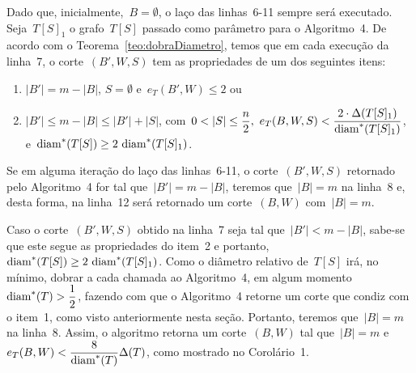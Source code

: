 		



		\bigskip

		Dado que, inicialmente,~$B=\emptyset$, o laço das
		linhas~6-11 sempre será executado.
		Seja~$T[S]_1$ o grafo~$T[S]$ passado como parâmetro para o Algoritmo~4.
		De acordo com o Teorema~\ref{teo:dobraDiametro},
		temos que em cada execução da linha~7, o corte~$(B',W,S)$
		tem as propriedades de um dos seguintes itens:
		\begin{enumerate}
			\item $|B'|=m-|B|$, $S=\emptyset$ e~$e_T(B',W)\le 2$ ou
			\item ${|B'|\le m-|B|\le |B'|+|S|}$, 
				com~${0<|S|\le\dfrac{n}{2},\
				e_T(B,W,S)< \dfrac{2\cdot 
				\Delta(T[S]_1)}{\diam^*(T[S]_1)}}$, 
				e~${\diam^*(T[S])\ge 2\ \diam^*(T[S]_1)}$.
		\end{enumerate} 
		Se em alguma iteração do laço das linhas~6-11, o corte~$(B',W,S)$ 
		retornado pelo Algoritmo~4 for tal que~${|B'| = m-|B|}$, 
		teremos que~${|B|=m}$ na linha~8 e,
		desta forma, na linha~12 será retornado um corte~$(B,W)$
		com~${|B| = m}$. 

		Caso o corte~$(B',W,S)$ obtido na linha~7 seja tal que~${|B'|<m-|B|}$,
		sabe-se que este segue as propriedades do item~2
		e portanto,~${\diam^*(T[S])\ge 2\ \diam^*(T[S]_1)}$.
		 Como o diâmetro relativo de~$T[S]$ irá, no mínimo,
		dobrar a cada chamada ao Algoritmo~4,
		em algum momento~${\mathrm{diam}^*(T)>\dfrac{1}{2}}$, fazendo
		com que o Algoritmo~4 retorne um corte
		que condiz com o item~1,
		como visto anteriormente nesta seção.
		Portanto, teremos que~${|B|=m}$ na linha~8.
		Assim, o algoritmo retorna um corte~$(B,W)$ tal que~${|B| = m}$ 
		e~${e_T(B,W) < \dfrac{8}{\mathrm{diam}^*(T)}\Delta(T)}$, como mostrado
		no Corolário~1.
		

